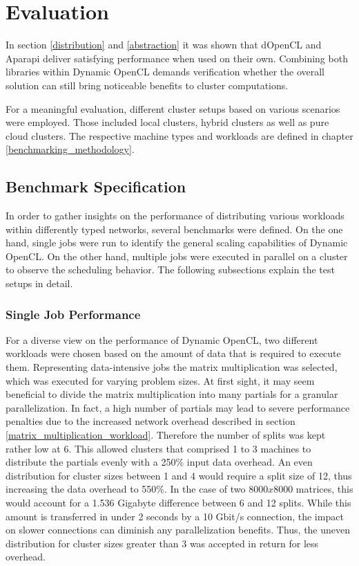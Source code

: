 \chapter{Evaluation}
\label{evaluation}
In section \ref{distribution} and \ref{abstraction} it was shown that dOpenCL and Aparapi deliver satisfying performance when used on their own. Combining both libraries within Dynamic OpenCL demands verification whether the overall solution can still bring noticeable benefits to cluster computations.

For a meaningful evaluation, different cluster setups based on various scenarios were employed. Those included local clusters, hybrid clusters as well as pure cloud clusters. The respective machine types and workloads are defined in chapter \ref{benchmarking_methodology}.

\section{Benchmark Specification}

In order to gather insights on the performance of distributing various workloads within differently typed networks, several benchmarks were defined. On the one hand, single jobs were run to identify the general scaling capabilities of Dynamic OpenCL. On the other hand, multiple jobs were executed in parallel on a cluster to observe the scheduling behavior. The following subsections explain the test setups in detail.

\subsection{Single Job Performance}

For a diverse view on the performance of Dynamic OpenCL, two different workloads were chosen based on the amount of data that is required to execute them. Representing data-intensive jobs the matrix multiplication was selected, which was executed for varying problem sizes. At first sight, it may seem beneficial to divide the matrix multiplication into many partials for a granular parallelization. In fact, a high number of partials may lead to severe performance penalties due to the increased network overhead described in section \ref{matrix_multiplication_workload}. Therefore the number of splits was kept rather low at 6. This allowed clusters that comprised 1 to 3 machines to distribute the partials evenly with a 250\% input data overhead. An even distribution for cluster sizes between 1 and 4 would require a split size of 12, thus increasing the data overhead to 550\%. In the case of two $8000x8000$ matrices, this would account for a 1.536 Gigabyte difference between 6 and 12 splits. While this amount is transferred in under 2 seconds by a 10 Gbit/s connection, the impact on slower connections can diminish any parallelization benefits. Thus, the uneven distribution for cluster sizes greater than 3 was accepted in return for less overhead.

